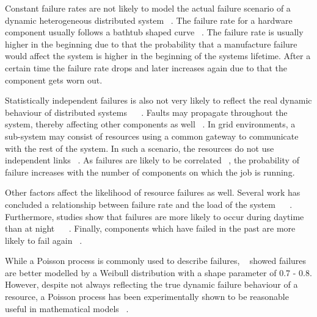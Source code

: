 \documentclass{cslthse-msc}
\begin{document}
Constant failure rates are not likely to model the actual failure scenario of a dynamic heterogeneous distributed system ~\cite{algoMinExTime}. The failure rate for a hardware component usually follows a bathtub shaped curve ~\cite{surveyReliabilityDistr}. The failure rate is usually higher in the beginning due to that the probability that a manufacture failure would affect the system is higher in the beginning of the systems lifetime. After a certain time the failure rate drops and later increases again due to that the component gets worn out.

Statistically independent failures is also not very likely to reflect the real dynamic behaviour of distributed systems ~\cite{surveyReliabilityDistr} ~\cite{cloudServiceRel}. Faults may propagate throughout the system, thereby affecting other components as well ~\cite{relGridSystems}. In grid environments, a sub-system may consist of resources using a common gateway to communicate with the rest of the system. In such a scenario, the resources do not use independent links ~\cite{optResourceAllMaxPerformance}. As failures are likely to be correlated ~\cite{perfImplPerCheckPoint}, the probability of failure increases with the number of components on which the job is running.

Other factors affect the likelihood of resource failures as well. Several work has concluded a relationship between failure rate and the load of the system ~\cite{studyOfFailures} ~\cite{implicationsOfFailures}. Furthermore, studies show that failures are more likely to occur during daytime than at night ~\cite{implicationsOfFailures} ~\cite{studyOfFailures}. Finally, components which have failed in the past are more likely to fail again ~\cite{implicationsOfFailures}.

While a Poisson process is commonly used to describe failures, ~\cite{studyOfFailures} showed failures are better modelled by a Weibull distribution with a shape parameter of 0.7 - 0.8. However, despite not always reflecting the true dynamic failure behaviour of a resource, a Poisson process has been experimentally shown to be reasonable useful in mathematical models ~\cite{experimentalFailureAssessment}.
\end{document}
